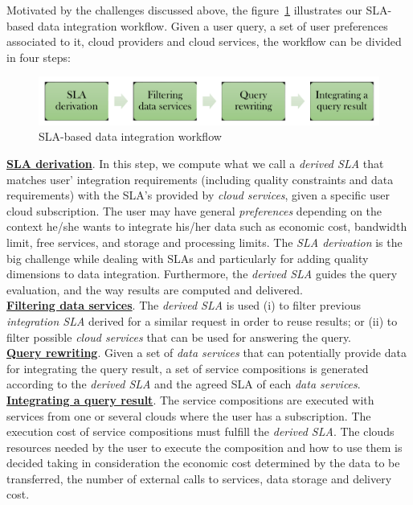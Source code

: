 Motivated by the challenges discussed above, the figure~\ref{fig:workflow} illustrates our SLA-based data integration workflow. Given a user query, a set of user preferences associated to it, cloud providers and cloud services, the workflow can be divided in four steps:

\begin{figure}[h!]
\center
\includegraphics[scale=0.40]{workflow-approach.pdf}
\caption{SLA-based data integration workflow}\label{fig:workflow}
\end{figure}

\noindent \textbf{\underline{SLA derivation}}. In this step, we compute what we call a \textsl{derived SLA} that matches user' integration requirements (including quality constraints and data requirements) with the SLA's provided by \textit{cloud services}, given a specific user cloud subscription. The user may have general \textit{preferences} depending on the context he/she wants to integrate his/her data such as economic cost, bandwidth limit, free services, and storage and processing limits. The \textit{SLA derivation} is the big challenge while dealing with SLAs and particularly for adding quality dimensions to data integration. Furthermore, the \textsl{derived SLA} guides the query evaluation, and the way results are computed and delivered. \\
\textbf{\underline{Filtering data services}}. The \textsl{derived SLA} is used (i)
to filter previous \textsl{integration SLA} derived for a similar request in order to reuse results; or (ii) to filter possible \textit{cloud services} that can be used for answering the query. \\ %
\textbf{\underline{Query rewriting}}. Given a set of \textit{data services} that can
potentially provide data for integrating the query result, a set of service compositions is generated according to the \textsl{derived SLA} and the agreed SLA of each \textit{data services}. \\
\textbf{\underline{Integrating a query result}}. The service compositions are
executed with services from one or several clouds where the user has a
subscription.
The execution cost of service compositions must fulfill the \textsl{derived
SLA}. The clouds resources needed by the user to execute the composition and how
to use them is decided taking in consideration the economic cost determined by
the data to be transferred, the number of external calls to services, data storage and delivery cost.

